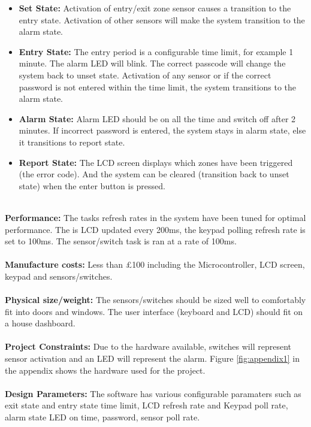 \documentclass[aps, secnumarabic, balancelastpage, asmath, amssymb, nofootinbib, floatfix,]{revtex4-2}
\begin{document}
{{\begin{itemize}
\item \textbf{Set State: }Activation of entry/exit zone sensor causes a transition to the entry state. Activation of other sensors will make the system transition to the alarm state.
\item \textbf{Entry State: }The entry period is a configurable time limit, for example 1 minute. The alarm LED will blink. The correct passcode will change the system back to unset state. Activation of any sensor or if the correct password is not entered within the time limit, the system transitions to the alarm state.
\item \textbf{Alarm State: }Alarm LED should be on all the time and switch off after 2 minutes. If incorrect password is entered, the system stays in alarm state, else it transitions to report state.
\item \textbf{Report State: }The LCD screen displays which zones have been triggered (the error code). And the system can be cleared (transition back to unset state) when the enter button is pressed.
\end{itemize}
~\\
{\bf Performance: }The tasks refresh rates in the system have been tuned for optimal performance. The is LCD updated every 200ms, the keypad polling refresh rate is set to 100ms. The sensor/switch task is ran at a rate of 100ms.
~\\
~\\
{\bf Manufacture costs: }Less than £100 including the Microcontroller, LCD screen, keypad and sensors/switches.
~\\
~\\
{\bf Physical size/weight: }The sensors/switches should be sized well to comfortably fit into doors and windows. The user interface (keyboard and LCD) should fit on a house dashboard.
~\\
~\\
{\bf Project Constraints: }Due to the hardware available, switches will represent sensor activation and an LED will represent the alarm. Figure \ref{fig:appendix1} in the appendix shows the hardware used for the project.
~\\
~\\
{\bf Design Parameters: }The software has various configurable paramaters such as exit state and entry state time limit, LCD refresh rate and Keypad poll rate, alarm state LED on time, password, sensor poll rate.


}

\clearpage

}
\end{document}
